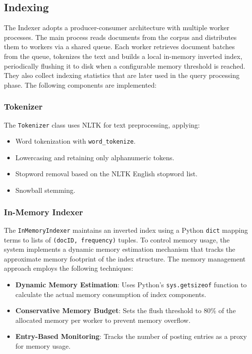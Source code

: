 \documentclass[sigconf]{acmart}
\begin{document}
\subsection{Indexing}
The Indexer adopts a producer-consumer architecture with multiple worker processes. The main process reads documents from the corpus and distributes them to workers via a shared queue. Each worker retrieves document batches from the queue, tokenizes the text and builds a local in-memory inverted index, periodically flushing it to disk when a configurable memory threshold is reached. They also collect indexing statistics that are later used in the query processing phase. The following components are implemented:

\subsubsection{Tokenizer}
The \texttt{Tokenizer} class uses NLTK for text preprocessing, applying:
\begin{itemize}
    \item Word tokenization with \texttt{word\_tokenize}.
    \item Lowercasing and retaining only alphanumeric tokens.
    \item Stopword removal based on the NLTK English stopword list.
    \item Snowball stemming.
\end{itemize}

\subsubsection{In-Memory Indexer}
The \texttt{InMemoryIndexer} maintains an inverted index using a Python \texttt{dict} mapping terms to lists of \texttt{(docID, frequency)} tuples. To control memory usage, the system implements a dynamic memory estimation mechanism that tracks the approximate memory footprint of the index structure.
The memory management approach employs the following techniques:
\begin{itemize}
  \item \textbf{Dynamic Memory Estimation}: Uses Python's \texttt{sys.getsizeof} function to calculate the actual memory consumption of index components.
  \item \textbf{Conservative Memory Budget}: Sets the flush threshold to 80\% of the allocated memory per worker to prevent memory overflow.
  \item \textbf{Entry-Based Monitoring}: Tracks the number of posting entries as a proxy for memory usage.
\end{itemize}
\end{document}

